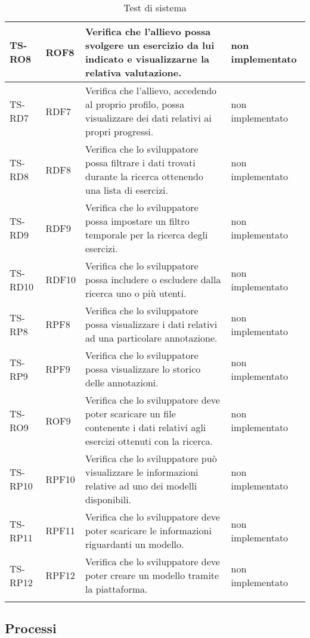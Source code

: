 {\begin{longtable}{|>{\centering\arraybackslash}m{1.6cm}|>{\centering\arraybackslash}m{1.7cm}|m{6.41cm}|>{\centering\arraybackslash}m{3.1cm}|}
		\rowcolor{LightGray}
		TS-RO8		
		& ROF8 
		& Verifica che l'allievo possa svolgere un esercizio da lui indicato e visualizzarne la relativa valutazione. 
		& non implementato\\ \hline
		\rowcolor{white}
		TS-RD7		
		& RDF7 
		& Verifica che l'allievo, accedendo al proprio profilo, possa visualizzare dei dati relativi ai propri progressi. 
		& non implementato\\ \hline
		\rowcolor{LightGray}
		TS-RD8		
		& RDF8 
		& Verifica che lo sviluppatore possa filtrare i dati trovati durante la ricerca ottenendo una lista di esercizi. 
		& non implementato\\ \hline
		\rowcolor{white}
		TS-RD9
		& RDF9 
		& Verifica che lo sviluppatore possa impostare un filtro temporale per la ricerca degli esercizi.
		& non implementato\\ \hline
		\rowcolor{LightGray}
		TS-RD10		
		& RDF10 
		& Verifica che lo sviluppatore possa includere o escludere dalla ricerca uno o più utenti. 
		& non implementato\\ \hline 
		\rowcolor{white}
		TS-RP8		
		& RPF8 
		& Verifica che lo sviluppatore possa visualizzare i dati relativi ad una particolare annotazione. 		
		& non implementato\\ \hline
		\rowcolor{LightGray}
		TS-RP9		
		& RPF9 
		& Verifica che lo sviluppatore possa visualizzare lo storico delle annotazioni. 
		&  non implementato\\ \hline
		\rowcolor{white}
		TS-RO9
		& ROF9 
		& Verifica che lo sviluppatore deve poter scaricare un file contenente i dati relativi agli esercizi ottenuti con la ricerca.
		& non implementato\\ \hline
		\rowcolor{LightGray}
		TS-RP10		
		& RPF10 
		& Verifica che lo sviluppatore può visualizzare le informazioni relative ad uno dei modelli disponibili. 
		& non implementato\\ \hline
		\rowcolor{white}
		TS-RP11		
		& RPF11 
		& Verifica che lo sviluppatore deve poter scaricare le informazioni riguardanti un modello. 
		& non implementato\\ \hline
		\rowcolor{LightGray}
		TS-RP12		
		& RPF12 
		& Verifica che lo sviluppatore deve poter creare un modello tramite la piattaforma. 
		& non implementato\\ \hline	
		
		\caption{Test di sistema}
\end{longtable}}
\subsection{Processi}
